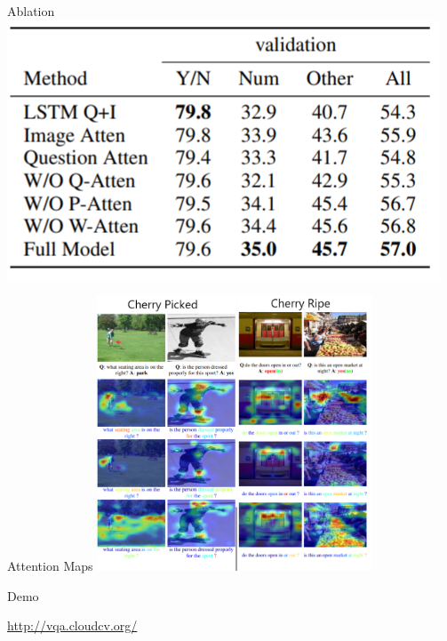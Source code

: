 \documentclass{beamer}
\begin{document}
\begin{frame}{Ablation}
\includegraphics[]{Annotation 2020-02-10 111716.png}
\end{frame}

\begin{frame}{Attention Maps}
\includegraphics[width=8.2cm]{Annotation 2020-02-10 113657.png} 
\end{frame}

\begin{frame}{Demo}

\url{http://vqa.cloudcv.org/}
    
\end{frame}
\end{document}
